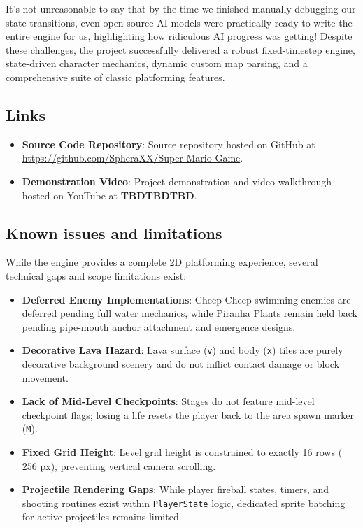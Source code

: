 \documentclass[12pt, a4paper]{article}
\begin{document}
It's not unreasonable to say that by the time we finished manually debugging our state transitions, even open-source AI models were practically ready to write the entire engine for us, highlighting how ridiculous AI progress was getting! Despite these challenges, the project successfully delivered a robust fixed-timestep engine, state-driven character mechanics, dynamic custom map parsing, and a comprehensive suite of classic platforming features.

\subsection{Links}

\begin{itemize}
\item \textbf{Source Code Repository}: Source repository hosted on GitHub at \url{https://github.com/SpheraXX/Super-Mario-Game}.
\item \textbf{Demonstration Video}: Project demonstration and video walkthrough hosted on YouTube at \textbf{TBDTBDTBD}.
\end{itemize}

\subsection{Known issues and limitations}

While the engine provides a complete 2D platforming experience, several technical gaps and scope limitations exist:

\begin{itemize}
\item \textbf{Deferred Enemy Implementations}: Cheep Cheep swimming enemies are deferred pending full water mechanics, while Piranha Plants remain held back pending pipe-mouth anchor attachment and emergence designs.
\item \textbf{Decorative Lava Hazard}: Lava surface (\texttt{v}) and body (\texttt{x}) tiles are purely decorative background scenery and do not inflict contact damage or block movement.
\item \textbf{Lack of Mid-Level Checkpoints}: Stages do not feature mid-level checkpoint flags; losing a life resets the player back to the area spawn marker (\texttt{M}).
\item \textbf{Fixed Grid Height}: Level grid height is constrained to exactly 16 rows ($256\text{ px}$), preventing vertical camera scrolling.
\item \textbf{Projectile Rendering Gaps}: While player fireball states, timers, and shooting routines exist within \texttt{PlayerState} logic, dedicated sprite batching for active projectiles remains limited.
\end{itemize}
\end{document}
